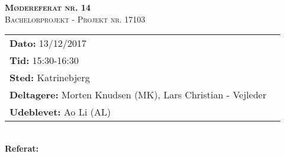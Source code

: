 
\newcommand{\HRule}{\rule{\linewidth}{0.1mm}}


	\begin{center}
		{\huge \bfseries \textsc{Mødereferat nr. 14}}\\
		\textsc{\large Bachelorprojekt - Projekt nr. 17103}\\[0.3cm]
	\end{center}
	\begin{tabular}{ll}
	\large \textbf{Dato:} 13/12/2017  	\\ %
	\large \textbf{Tid:}  15:30-16:30 	\\ %
	\large \textbf{Sted:} Katrinebjerg		\\ %
	\large \textbf{Deltagere:} Morten Knudsen (MK), Lars Christian - Vejleder \\
	\large \textbf{Udeblevet:} Ao Li (AL)
	\end{tabular}\\
	\phantom{\,}\hspace{0.1em} \large \textbf{Referat:}
